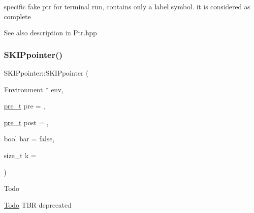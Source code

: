 specific fake ptr for terminal run, contains only a label symbol. it is considered as complete 

\begin{DoxySeeAlso}{See also}
description in Ptr.\+hpp 
\end{DoxySeeAlso}
\mbox{\label{group__table_gab217454122f2ec0af5c16bb1ae996925}} 
\subsubsection{\texorpdfstring{SKIPpointer()}{SKIPpointer()}\hspace{0.1cm}{\footnotesize\ttfamily [3/7]}}
{\footnotesize\ttfamily S\+K\+I\+Ppointer\+::\+S\+K\+I\+Ppointer (\begin{DoxyParamCaption}\item[{\mbox{\hyperlink{classEnvironment}{Environment}} $\ast$}]{env,  }\item[{\mbox{\hyperlink{group__general_ga092fe8b972dfa977c2a0886720a7731e}{pre\+\_\+t}}}]{pre = {},  }\item[{\mbox{\hyperlink{group__general_ga092fe8b972dfa977c2a0886720a7731e}{pre\+\_\+t}}}]{post = {},  }\item[{bool}]{bar = {\ttfamily false},  }\item[{size\+\_\+t}]{k = {} }\end{DoxyParamCaption})}

\begin{DoxyRefDesc}{Todo}
\item[\mbox{\hyperlink{todo__todo000034}{Todo}}]T\+BR deprecated \end{DoxyRefDesc}
\mbox{\label{group__table_ga8a29b4e0af8d4fc8d298b7027e4cf638}} 
